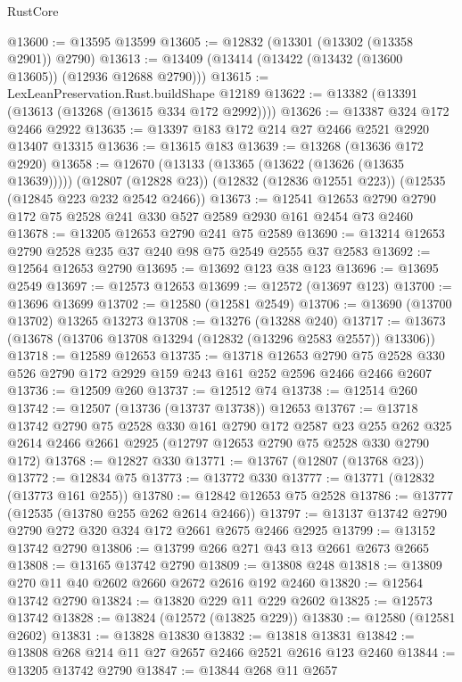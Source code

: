 \begin{lexlean}{RustCore}
\begin{coremodule}
@13600 := @13595 @13599
@13605 := @12832 (@13301 (@13302 (@13358 @2901)) @2790)
@13613 := @13409 (@13414 (@13422 (@13432 (@13600 @13605)) (@12936 @12688 @2790)))
@13615 := LexLeanPreservation.Rust.buildShape @12189
@13622 := @13382 (@13391 (@13613 (@13268 (@13615 @334 @172 @2992))))
@13626 := @13387 @324 @172 @2466 @2922
@13635 := @13397 @183 @172 @214 @27 @2466 @2521 @2920 @13407 @13315
@13636 := @13615 @183
@13639 := @13268 (@13636 @172 @2920)
@13658 := @12670
    (@13133 (@13365 (@13622 (@13626 (@13635 @13639)))))
    (@12807 (@12828 @23))
    (@12832 (@12836 @12551 @223))
    (@12535 (@12845 @223 @232 @2542 @2466))
@13673 := @12541 @12653 @2790 @2790 @172 @75 @2528 @241 @330 @527 @2589 @2930 @161 @2454 @73 @2460
@13678 := @13205 @12653 @2790 @241 @75 @2589
@13690 := @13214 @12653 @2790 @2528 @235 @37 @240 @98 @75 @2549 @2555 @37 @2583
@13692 := @12564 @12653 @2790
@13695 := @13692 @123 @38 @123
@13696 := @13695 @2549
@13697 := @12573 @12653
@13699 := @12572 (@13697 @123)
@13700 := @13696 @13699
@13702 := @12580 (@12581 @2549)
@13706 := @13690 (@13700 @13702) @13265 @13273
@13708 := @13276 (@13288 @240)
@13717 := @13673 (@13678 (@13706 @13708 @13294 (@12832 (@13296 @2583 @2557)) @13306))
@13718 := @12589 @12653
@13735 := @13718
    @12653
    @2790
    @75
    @2528
    @330
    @526
    @2790
    @172
    @2929
    @159
    @243
    @161
    @252
    @2596
    @2466
    @2466
    @2607
@13736 := @12509 @260
@13737 := @12512 @74
@13738 := @12514 @260
@13742 := @12507 (@13736 (@13737 @13738)) @12653
@13767 := @13718
    @13742
    @2790
    @75
    @2528
    @330
    @161
    @2790
    @172
    @2587
    @23
    @255
    @262
    @325
    @2614
    @2466
    @2661
    @2925
    (@12797 @12653 @2790 @75 @2528 @330 @2790 @172)
@13768 := @12827 @330
@13771 := @13767 (@12807 (@13768 @23))
@13772 := @12834 @75
@13773 := @13772 @330
@13777 := @13771 (@12832 (@13773 @161 @255))
@13780 := @12842 @12653 @75 @2528
@13786 := @13777 (@12535 (@13780 @255 @262 @2614 @2466))
@13797 := @13137 @13742 @2790 @2790 @272 @320 @324 @172 @2661 @2675 @2466 @2925
@13799 := @13152 @13742 @2790
@13806 := @13799 @266 @271 @43 @13 @2661 @2673 @2665
@13808 := @13165 @13742 @2790
@13809 := @13808 @248
@13818 := @13809 @270 @11 @40 @2602 @2660 @2672 @2616 @192 @2460
@13820 := @12564 @13742 @2790
@13824 := @13820 @229 @11 @229 @2602
@13825 := @12573 @13742
@13828 := @13824 (@12572 (@13825 @229))
@13830 := @12580 (@12581 @2602)
@13831 := @13828 @13830
@13832 := @13818 @13831
@13842 := @13808 @268 @214 @11 @27 @2657 @2466 @2521 @2616 @123 @2460
@13844 := @13205 @13742 @2790
@13847 := @13844 @268 @11 @2657

\end{coremodule}
\end{lexlean}
